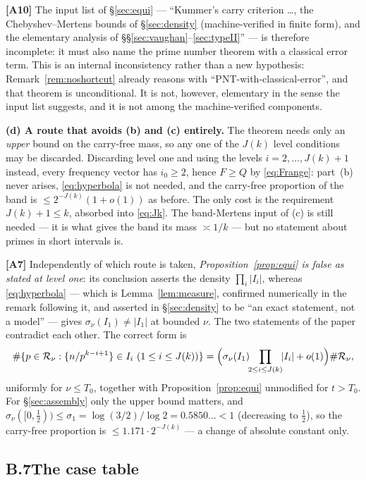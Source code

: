 \documentclass[11pt]{article}
\theoremstyle{definition}
\theoremstyle{plain}
\begin{document}
\textbf{[A10]}  The input list of \S\ref{sec:equi} --- ``Kummer's carry
criterion \dots, the Chebyshev--Mertens bounds of \S\ref{sec:density}
(machine-verified in finite form), and the elementary analysis of
\S\S\ref{sec:vaughan}--\ref{sec:typeII}'' --- is therefore incomplete: it
must also name the prime number theorem with a classical error term.
This is an internal inconsistency rather than a new hypothesis:
Remark~\ref{rem:noshortcut} already reasons with
``PNT-with-classical-error'', and that theorem is unconditional.  It is
not, however, elementary in the sense the input list suggests, and it is
not among the machine-verified components.

\smallskip
\noindent\textbf{(d) A route that avoids (b) and (c) entirely.}  The
theorem needs only an \emph{upper} bound on the carry-free mass, so any
one of the $J(k)$ level conditions may be discarded.  Discarding level
one and using the levels $i=2,\dots,J(k)+1$ instead, every frequency
vector has $i_{0}\ge2$, hence $F\ge Q$ by \eqref{eq:Frange}: part~(b)
never arises, \eqref{eq:hyperbola} is not needed, and the carry-free
proportion of the band is $\le2^{-J(k)}(1+o(1))$ as before.  The only
cost is the requirement $J(k)+1\le k$, absorbed into \eqref{eq:Jk}.  The
band-Mertens input of (c) is still needed --- it is what gives the band
its mass $\asymp1/k$ --- but no statement about primes in short intervals
is.

\smallskip
\textbf{[A7]}  Independently of which route is taken,
\emph{Proposition~\ref{prop:equi} is false as stated at level one}: its
conclusion asserts the density $\prod_{i}|I_{i}|$, whereas
\eqref{eq:hyperbola} --- which is Lemma~\ref{lem:measure}, confirmed
numerically in the remark following it, and asserted in
\S\ref{sec:density} to be ``an exact statement, not a model'' --- gives
$\sigma_{\nu}(I_{1})\ne|I_{1}|$ at bounded $\nu$.  The two statements of
the paper contradict each other.  The correct form is
\[
\#\{p\in\mathcal R_{\nu}:\{n/p^{k-i+1}\}\in I_{i}\ (1\le i\le J(k))\}
=\Bigl(\sigma_{\nu}(I_{1})\!\!\prod_{2\le i\le J(k)}\!\!|I_{i}|+o(1)\Bigr)
\#\mathcal R_{\nu},
\]
uniformly for $\nu\le T_{0}$, together with Proposition~\ref{prop:equi}
unmodified for $t>T_{0}$.  For \S\ref{sec:assembly} only the upper bound
matters, and $\sigma_{\nu}([0,\tfrac12))\le\sigma_{1}
=\log(3/2)/\log2=0.5850\ldots<1$ (decreasing to $\tfrac12$), so the
carry-free proportion is $\le1.171\cdot2^{-J(k)}$ --- a change of
absolute constant only.

\subsection*{B.7\quad The case table}
\end{document}
